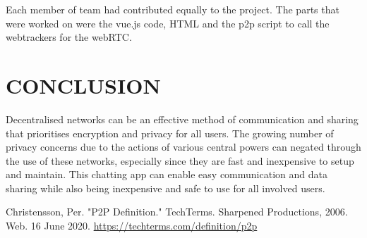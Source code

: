 \documentclass{fisatproject}
\begin{document}
Each member of team had contributed equally to the project. The parts that were worked on were the vue.js code, HTML and the p2p script to call the webtrackers for the webRTC. 






\chapter{CONCLUSION}

Decentralised networks can be an effective method of communication and sharing that prioritises encryption and privacy for all users. The growing number of privacy concerns due to the actions of various central powers can negated through the use of these networks, especially since they are fast and inexpensive to setup and maintain. This chatting app can enable easy communication and data sharing while also being inexpensive and safe to use for all involved users.
\newpage



\begin{thebibliography}{1}
	 Christensson, Per. "P2P Definition." TechTerms. Sharpened Productions, 2006. Web. 16 June 2020. 
	\url{https://techterms.com/definition/p2p}
	
\end{thebibliography}
\end{document}
